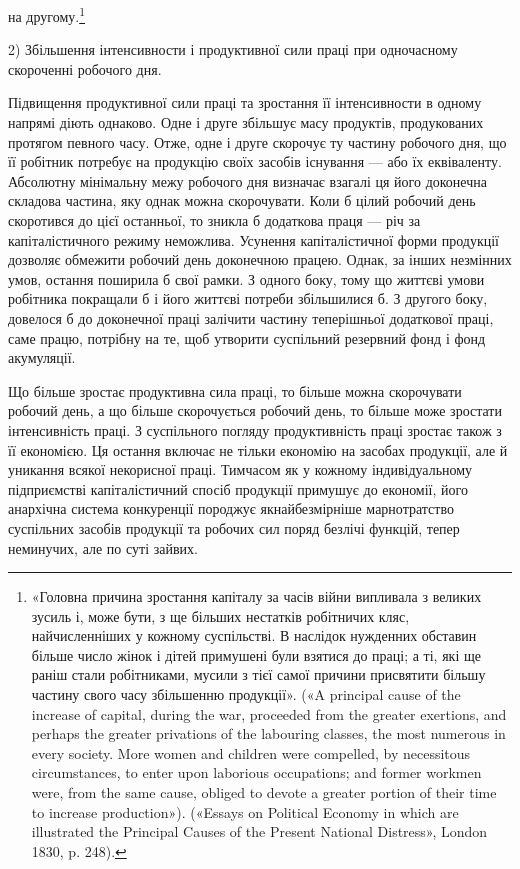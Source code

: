 на другому.\footnote{
«Головна причина зростання капіталу за часів війни випливала
з великих зусиль і, може бути, з ще більших нестатків робітничих кляс,
найчисленніших у кожному суспільстві. В наслідок нужденних обставин
більше число жінок і дітей примушені були взятися до праці; а ті, які
ще раніш стали робітниками, мусили з тієї самої причини присвятити
більшу частину свого часу збільшенню продукції». («A principal cause
of the increase of capital, during the war, proceeded from the greater exertions,
and perhaps the greater privations of the labouring classes, the most
numerous in every society. More women and children were compelled, by
necessitous circumstances, to enter upon laborious occupations; and former
workmen were, from the same cause, obliged to devote a greater portion
of their time to increase production»). («Essays on Political Economy in
which are illustrated the Principal Causes of the Present National Distress»,
London 1830, p. 248).
}

2) Збільшення інтенсивности і продуктивної сили праці при
одночасному скороченні робочого дня.

Підвищення продуктивної сили праці та зростання її інтенсивности
в одному напрямі діють однаково. Одне і друге збільшує
масу продуктів, продукованих протягом певного часу. Отже,
одне і друге скорочує ту частину робочого дня, що її робітник
потребує на продукцію своїх засобів існування — або їх еквіваленту.
Абсолютну мінімальну межу робочого дня визначає
взагалі ця його доконечна складова частина, яку однак можна
скорочувати. Коли б цілий робочий день скоротився до цієї останньої,
то зникла б додаткова праця — річ за капіталістичного
режиму неможлива. Усунення капіталістичної форми продукції
дозволяє обмежити робочий день доконечною працею. Однак, за
інших незмінних умов, остання поширила б свої рамки. З одного
боку, тому що життєві умови робітника покращали б і його життєві
потреби збільшилися б. З другого боку, довелося б до доконечної
праці залічити частину теперішньої додаткової праці,
саме працю, потрібну на те, щоб утворити суспільний резервний
фонд і фонд акумуляції.

Що більше зростає продуктивна сила праці, то більше можна
скорочувати робочий день, а що більше скорочується робочий
день, то більше може зростати інтенсивність праці. З суспільного
погляду продуктивність праці зростає також з її економією. Ця
остання включає не тільки економію на засобах продукції, але й
уникання всякої некорисної праці. Тимчасом як у кожному індивідуальному
підприємстві капіталістичний спосіб продукції примушує
до економії, його анархічна система конкуренції породжує
якнайбезмірніше марнотратство суспільних засобів продукції
та робочих сил поряд безлічі функцій, тепер неминучих, але по
суті зайвих.


